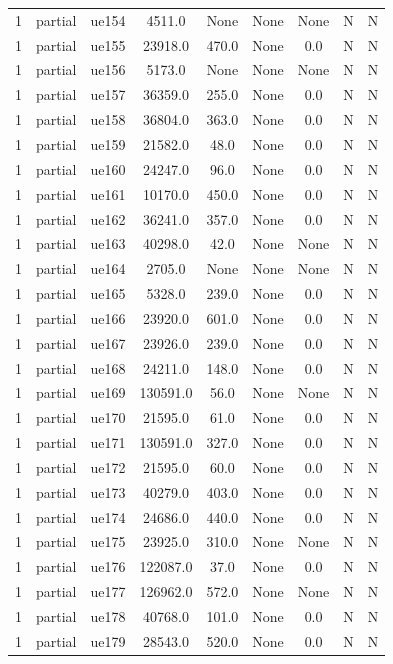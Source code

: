 \begin{table}[ht]
\begin{tabular}{|c|c|c|c|c|c|c|c|c|}
1 & partial & ue154 & 4511.0 & None & None & None & N & N \\
1 & partial & ue155 & 23918.0 & 470.0 & None & 0.0 & N & N \\
1 & partial & ue156 & 5173.0 & None & None & None & N & N \\
1 & partial & ue157 & 36359.0 & 255.0 & None & 0.0 & N & N \\
1 & partial & ue158 & 36804.0 & 363.0 & None & 0.0 & N & N \\
1 & partial & ue159 & 21582.0 & 48.0 & None & 0.0 & N & N \\
1 & partial & ue160 & 24247.0 & 96.0 & None & 0.0 & N & N \\
1 & partial & ue161 & 10170.0 & 450.0 & None & 0.0 & N & N \\
1 & partial & ue162 & 36241.0 & 357.0 & None & 0.0 & N & N \\
1 & partial & ue163 & 40298.0 & 42.0 & None & None & N & N \\
1 & partial & ue164 & 2705.0 & None & None & None & N & N \\
1 & partial & ue165 & 5328.0 & 239.0 & None & 0.0 & N & N \\
1 & partial & ue166 & 23920.0 & 601.0 & None & 0.0 & N & N \\
1 & partial & ue167 & 23926.0 & 239.0 & None & 0.0 & N & N \\
1 & partial & ue168 & 24211.0 & 148.0 & None & 0.0 & N & N \\
1 & partial & ue169 & 130591.0 & 56.0 & None & None & N & N \\
1 & partial & ue170 & 21595.0 & 61.0 & None & 0.0 & N & N \\
1 & partial & ue171 & 130591.0 & 327.0 & None & 0.0 & N & N \\
1 & partial & ue172 & 21595.0 & 60.0 & None & 0.0 & N & N \\
1 & partial & ue173 & 40279.0 & 403.0 & None & 0.0 & N & N \\
1 & partial & ue174 & 24686.0 & 440.0 & None & 0.0 & N & N \\
1 & partial & ue175 & 23925.0 & 310.0 & None & None & N & N \\
1 & partial & ue176 & 122087.0 & 37.0 & None & 0.0 & N & N \\
1 & partial & ue177 & 126962.0 & 572.0 & None & None & N & N \\
1 & partial & ue178 & 40768.0 & 101.0 & None & 0.0 & N & N \\
1 & partial & ue179 & 28543.0 & 520.0 & None & 0.0 & N & N \\

\end{tabular}
\end{table}
